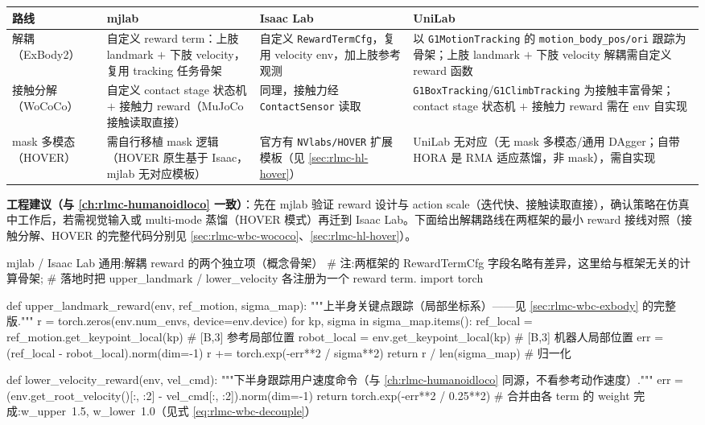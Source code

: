 \begin{center}
\small
\begin{tabular}{p{2.2cm}p{3.4cm}p{3.4cm}p{2.6cm}}
\hline
路线 & mjlab & Isaac Lab & UniLab \\
\hline
解耦（ExBody2） & 自定义 reward term：上肢 landmark $+$ 下肢 velocity，复用 tracking 任务骨架 & 自定义 \texttt{RewardTermCfg}，复用 velocity env，加上肢参考观测 & 以 \texttt{G1MotionTracking} 的 \texttt{motion\_body\_pos/\allowbreak ori} 跟踪为骨架；上肢 landmark $+$ 下肢 velocity 解耦需自定义 reward 函数\cite{unilab2026} \\
接触分解（WoCoCo） & 自定义 contact stage 状态机 $+$ 接触力 reward（MuJoCo 接触读取直接） & 同理，接触力经 \texttt{ContactSensor} 读取 & \texttt{G1BoxTracking}/\allowbreak\texttt{G1ClimbTracking} 为接触丰富骨架；contact stage 状态机 $+$ 接触力 reward 需在 env 自实现\cite{unilab2026} \\
mask 多模态（HOVER） & 需自行移植 mask 逻辑（HOVER 原生基于 Isaac，mjlab 无对应模板） & 官方有 \texttt{NVlabs/\allowbreak HOVER} 扩展模板（见 \cref{sec:rlmc-hl-hover}） & UniLab 无对应（无 mask 多模态/通用 DAgger；自带 HORA 是 RMA 适应蒸馏，非 mask），需自实现\cite{unilab2026} \\
\hline
\end{tabular}
\end{center}

\textbf{工程建议（与 \cref{ch:rlmc-humanoidloco} 一致）}：先在 mjlab 验证 reward 设计与 action scale（迭代快、接触读取直接），确认策略在仿真中工作后，若需视觉输入或 multi-mode 蒸馏（HOVER 模式）再迁到 Isaac Lab。下面给出解耦路线在两框架的最小 reward 接线对照（接触分解、HOVER 的完整代码分别见 \cref{sec:rlmc-wbc-wococo}、\cref{sec:rlmc-hl-hover}）。

\begin{codebox}[Python]{mjlab / Isaac Lab 通用:解耦 reward 的两个独立项（概念骨架）}
# 注:两框架的 RewardTermCfg 字段名略有差异，这里给与框架无关的计算骨架;
# 落地时把 upper_landmark / lower_velocity 各注册为一个 reward term.
import torch

def upper_landmark_reward(env, ref_motion, sigma_map):
    """上半身关键点跟踪（局部坐标系）——见 \cref{sec:rlmc-wbc-exbody} 的完整版."""
    r = torch.zeros(env.num_envs, device=env.device)
    for kp, sigma in sigma_map.items():
        ref_local   = ref_motion.get_keypoint_local(kp)   # [B,3] 参考局部位置
        robot_local = env.get_keypoint_local(kp)          # [B,3] 机器人局部位置
        err = (ref_local - robot_local).norm(dim=-1)
        r += torch.exp(-err**2 / sigma**2)
    return r / len(sigma_map)                              # 归一化

def lower_velocity_reward(env, vel_cmd):
    """下半身跟踪用户速度命令（与 \cref{ch:rlmc-humanoidloco} 同源，不看参考动作速度）."""
    err = (env.get_root_velocity()[:, :2] - vel_cmd[:, :2]).norm(dim=-1)
    return torch.exp(-err**2 / 0.25**2)
# 合并由各 term 的 weight 完成:w_upper~1.5, w_lower~1.0（见式 \eqref{eq:rlmc-wbc-decouple}）
\end{codebox}

